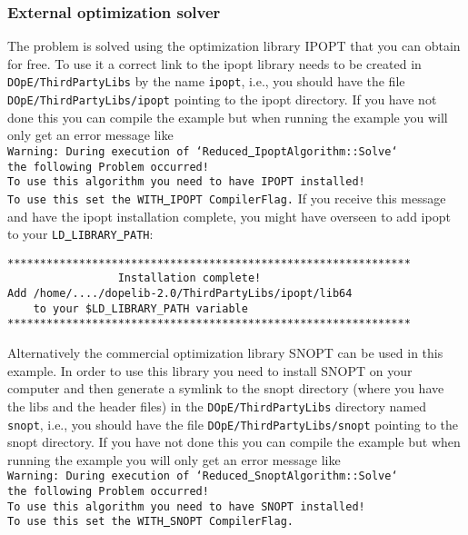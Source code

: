\subsubsection{External optimization solver}
The problem is solved using the optimization library IPOPT that you can obtain for free. To use it 
a correct link to the ipopt library needs to be created in  {\tt DOpE/ThirdPartyLibs} by the name 
{\tt ipopt}, i.e., you should have the file
{\tt DOpE/ThirdPartyLibs/ipopt} pointing to the ipopt directory. If you have not done this you can compile the
example but when running the example you will only get an error message like\\
{\tt Warning: During execution of `Reduced\underline{ }IpoptAlgorithm::Solve`\\ the following Problem occurred!\\
To use this algorithm you need to have IPOPT installed! \\To use this set the WITH\underline{ }IPOPT CompilerFlag.}
If you receive this message and have the ipopt installation complete, you
might have overseen to add ipopt to your {\tt LD\underline{ }LIBRARY\underline{ }PATH}:
\begin{lstlisting}
**************************************************************
                 Installation complete!
Add /home/..../dopelib-2.0/ThirdPartyLibs/ipopt/lib64
    to your $LD_LIBRARY_PATH variable
**************************************************************
\end{lstlisting}


Alternatively the commercial optimization library SNOPT can be used in this example.
In order to use this library you need to install SNOPT on your computer and then generate a symlink to 
the snopt directory (where you have the libs and the header files) 
in the {\tt DOpE/ThirdPartyLibs} directory named {\tt snopt}, i.e., you should have the file
{\tt DOpE/ThirdPartyLibs/snopt} pointing to the snopt directory. If you have not done this you can compile the
example but when running the example you will only get an error message like\\
{\tt Warning: During execution of `Reduced\underline{ }SnoptAlgorithm::Solve`\\ the following Problem occurred!\\
To use this algorithm you need to have SNOPT installed! \\To use this set the WITH\underline{ }SNOPT CompilerFlag.} 
